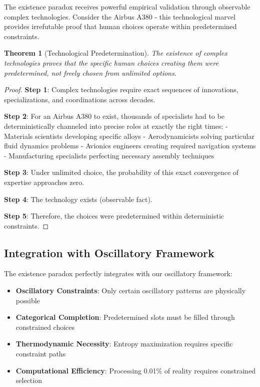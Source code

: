 \documentclass[11pt]{article}
\newtheorem{theorem}{Theorem}[section]
\theoremstyle{remark}
\begin{document}
The existence paradox receives powerful empirical validation through observable complex technologies. Consider the Airbus A380 - this technological marvel provides irrefutable proof that human choices operate within predetermined constraints.

\begin{theorem}[Technological Predetermination]
The existence of complex technologies proves that the specific human choices creating them were predetermined, not freely chosen from unlimited options.
\end{theorem}

\begin{proof}
\textbf{Step 1}: Complex technologies require exact sequences of innovations, specializations, and coordinations across decades.

\textbf{Step 2}: For an Airbus A380 to exist, thousands of specialists had to be deterministically channeled into precise roles at exactly the right times:
- Materials scientists developing specific alloys
- Aerodynamicists solving particular fluid dynamics problems  
- Avionics engineers creating required navigation systems
- Manufacturing specialists perfecting necessary assembly techniques

\textbf{Step 3}: Under unlimited choice, the probability of this exact convergence of expertise approaches zero.

\textbf{Step 4}: The technology exists (observable fact).

\textbf{Step 5}: Therefore, the choices were predetermined within deterministic constraints.
\end{proof}

\subsection{Integration with Oscillatory Framework}

The existence paradox perfectly integrates with our oscillatory framework:

\begin{itemize}
\item \textbf{Oscillatory Constraints}: Only certain oscillatory patterns are physically possible
\item \textbf{Categorical Completion}: Predetermined slots must be filled through constrained choices
\item \textbf{Thermodynamic Necessity}: Entropy maximization requires specific constraint paths
\item \textbf{Computational Efficiency}: Processing 0.01\% of reality requires constrained selection
\end{itemize}
\end{document}
